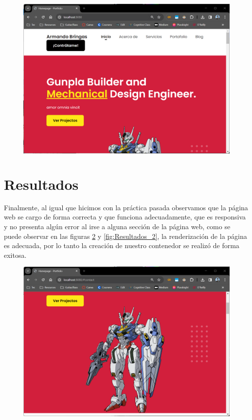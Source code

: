 \documentclass[12pt,a4paper]{article}
\begin{document}
\begin{figure}[H]
    \centering
    \includegraphics[width=1\linewidth]{M3_Virtualización_y_Contenedores/Tarea_3_Creación_Contenedor_Docker/reporte/figuras/6-1_Carga del_Sitio_Web.png}
    \label{fig:Carga_web_1}
\end{figure}


\section{Resultados}

Finalmente, al igual que hicimos con la práctica pasada observamos que la página web se cargo de forma correcta y que funciona adecuadamente, que es responsiva y no presenta algún error al irse a alguna sección de la página web, como se puede observar en las figuras \ref{fig:Resultados_1} y \ref{fig:Resultados_2}, la renderización de la página es adecuada, por lo tanto la creación de nuestro contenedor se realizó de forma exitosa.

\begin{figure}[H]
    \centering
    \includegraphics[width=.85\linewidth]{M3_Virtualización_y_Contenedores/Tarea_3_Creación_Contenedor_Docker/reporte/figuras/7-1_Resultados.png}
    \label{fig:Resultados_1}
\end{figure}
\end{document}
